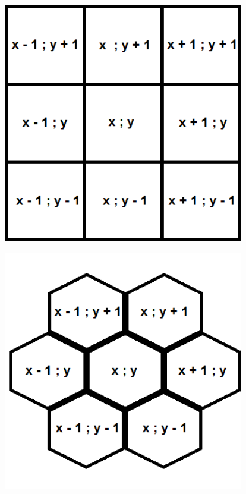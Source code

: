 \documentclass{article}
\newenvironment{Figure}
  {\par\medskip\noindent\minipage{\linewidth}}
  {\endminipage\par\medskip}
\begin{document}
\begin{multicols}{2}
\begin{Figure}
 \centering
 \includegraphics[width=0.79\textwidth]{imgs/cartesian.png}
\label{fig:cartesianstd}
\end{Figure}
\begin{Figure}
 \centering
 \includegraphics[width=0.79\textwidth]{imgs/hexagonal.png}
\label{fig:hexstd}
\end{Figure}
\begin{Figure}
 \centering

\end{Figure}
\end{multicols}
\end{document}
